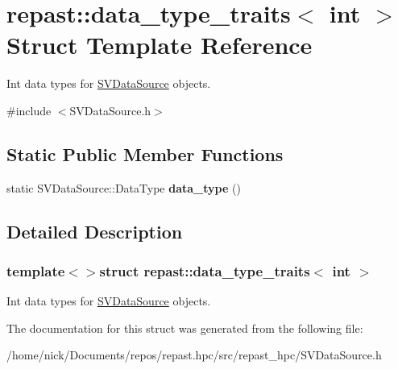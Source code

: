 \hypertarget{structrepast_1_1data__type__traits_3_01int_01_4}{\section{repast\-:\-:data\-\_\-type\-\_\-traits$<$ int $>$ Struct Template Reference}
\label{structrepast_1_1data__type__traits_3_01int_01_4}
}


Int data types for \hyperlink{classrepast_1_1_s_v_data_source}{S\-V\-Data\-Source} objects.  




{\ttfamily \#include $<$S\-V\-Data\-Source.\-h$>$}

\subsection*{Static Public Member Functions}
\begin{DoxyCompactItemize}
\item 
\hypertarget{structrepast_1_1data__type__traits_3_01int_01_4_a0a060997b4e9c8dc6134925c5775a066}{static S\-V\-Data\-Source\-::\-Data\-Type {\bfseries data\-\_\-type} ()}\label{structrepast_1_1data__type__traits_3_01int_01_4_a0a060997b4e9c8dc6134925c5775a066}

\end{DoxyCompactItemize}


\subsection{Detailed Description}
\subsubsection*{template$<$$>$struct repast\-::data\-\_\-type\-\_\-traits$<$ int $>$}

Int data types for \hyperlink{classrepast_1_1_s_v_data_source}{S\-V\-Data\-Source} objects. 

The documentation for this struct was generated from the following file\-:\begin{DoxyCompactItemize}
\item 
/home/nick/\-Documents/repos/repast.\-hpc/src/repast\-\_\-hpc/S\-V\-Data\-Source.\-h\end{DoxyCompactItemize}
